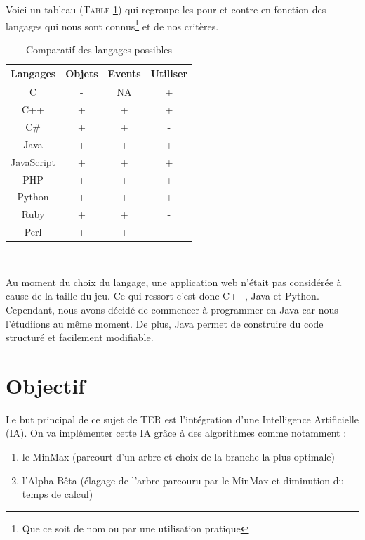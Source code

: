 \documentclass[11pt,a4paper]{article}
\begin{document}
\vspace{10px}

Voici un tableau (\textsc{Table} \ref{tab:tableauChoixLangages}) qui regroupe les pour et contre en fonction des langages qui nous sont connus\footnote{Que ce soit de nom ou par une utilisation pratique} et de nos critères. \\

\begin{table}[htbp]
    \centering
    \begin{tabular}{|*{4}{c|}}
      \hline
      Langages & Objets & Events & Utiliser\\
      \hline
      C & - & NA & +\\
      \hline
      C++ & + & + & +\\
      \hline
      C\# & + & + & -\\
      \hline
      Java & + & + & +\\
      \hline
      JavaScript & + & + & + \\
      \hline
      PHP & + & + & +  \\
      \hline
      Python & + & + & + \\
      \hline
      Ruby & + & + & - \\
      \hline
      Perl & + & + & -\\
      \hline
    \end{tabular}\\
    \label{tab:tableauChoixLangages}
    \caption{Comparatif des langages possibles}
\end{table}

\newpage

Au moment du choix du langage, une application web n'était pas considérée à cause de la taille du jeu. Ce qui ressort c'est donc C++, Java et Python. Cependant, nous avons décidé de commencer à programmer en Java car nous l'étudiions au même moment. De plus, Java permet de construire du code structuré et facilement modifiable.

\section{Objectif}

Le but principal de ce sujet de TER est l'intégration d'une Intelligence Artificielle (IA). On va implémenter cette IA grâce à des algorithmes comme notamment :
\begin{enumerate}
    \item le MinMax (parcourt d'un arbre et choix de la branche la plus optimale)
    \item l'Alpha-Bêta (élagage de l'arbre parcouru par le MinMax et diminution du temps de calcul)
\end{enumerate}
\end{document}
